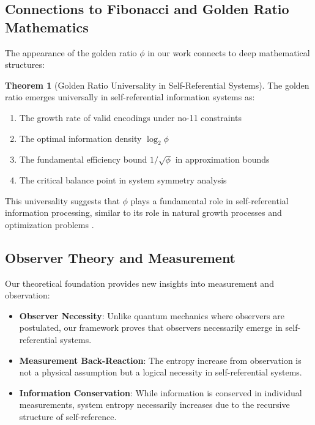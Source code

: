 \documentclass[11pt]{article}
\theoremstyle{remark}
\theoremstyle{definition}
\newtheorem{theorem}{Theorem}
\begin{document}
\subsection{Connections to Fibonacci and Golden Ratio Mathematics}

The appearance of the golden ratio $\phi$ in our work connects to deep mathematical structures:

\begin{theorem}[Golden Ratio Universality in Self-Referential Systems]
The golden ratio emerges universally in self-referential information systems as:
\begin{enumerate}
\item The growth rate of valid encodings under no-11 constraints
\item The optimal information density $\log_2 \phi$
\item The fundamental efficiency bound $1/\sqrt{\phi}$ in approximation bounds
\item The critical balance point in system symmetry analysis
\end{enumerate}
\end{theorem}

This universality suggests that $\phi$ plays a fundamental role in self-referential information processing, similar to its role in natural growth processes and optimization problems \cite{livio2002golden}.

\subsection{Observer Theory and Measurement}

Our theoretical foundation provides new insights into measurement and observation:

\begin{itemize}
\item \textbf{Observer Necessity}: Unlike quantum mechanics where observers are postulated, our framework proves that observers necessarily emerge in self-referential systems.
\item \textbf{Measurement Back-Reaction}: The entropy increase from observation is not a physical assumption but a logical necessity in self-referential systems.
\item \textbf{Information Conservation}: While information is conserved in individual measurements, system entropy necessarily increases due to the recursive structure of self-reference.
\end{itemize}
\end{document}
